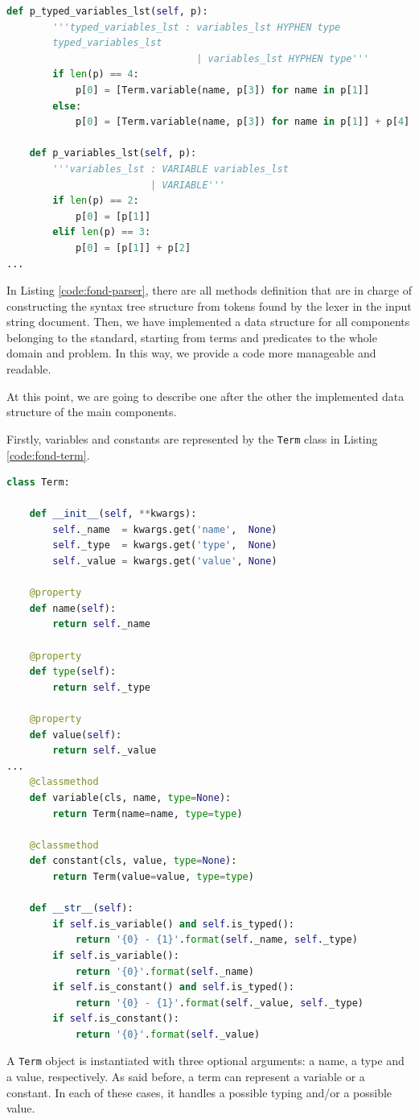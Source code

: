 \begin{lstlisting}[language=Python, style=Python, escapechar = £,  label={code:fond-parser}, caption={The \texttt{MyParser} class.}]
    def p_typed_variables_lst(self, p):
        '''typed_variables_lst : variables_lst HYPHEN type 
        typed_variables_lst
                                 | variables_lst HYPHEN type'''
        if len(p) == 4:
            p[0] = [Term.variable(name, p[3]) for name in p[1]]
        else:
            p[0] = [Term.variable(name, p[3]) for name in p[1]] + p[4]

    def p_variables_lst(self, p):
        '''variables_lst : VARIABLE variables_lst
                         | VARIABLE'''
        if len(p) == 2:
            p[0] = [p[1]]
        elif len(p) == 3:
            p[0] = [p[1]] + p[2]
...
\end{lstlisting}
In Listing \ref{code:fond-parser}, there are all methods definition that are in charge of constructing the syntax tree structure from tokens found by the lexer in the input string document. Then, we have implemented a data structure for all components belonging to the \PDDL standard, starting from terms and predicates to the whole domain and problem. In this way, we provide a code more manageable and readable.

At this point, we are going to describe one after the other the implemented data structure of the main \PDDL components.

Firstly, variables and constants are represented by the \texttt{Term} class in Listing \ref{code:fond-term}.

\begin{lstlisting}[language=Python, style=Python, escapechar = £,  label={code:fond-term}, caption={The \texttt{Term} class.}]
class Term:

    def __init__(self, **kwargs):
        self._name  = kwargs.get('name',  None)
        self._type  = kwargs.get('type',  None)
        self._value = kwargs.get('value', None)

    @property
    def name(self):
        return self._name

    @property
    def type(self):
        return self._type

    @property
    def value(self):
        return self._value
...
    @classmethod
    def variable(cls, name, type=None):
        return Term(name=name, type=type)

    @classmethod
    def constant(cls, value, type=None):
        return Term(value=value, type=type)

    def __str__(self):
        if self.is_variable() and self.is_typed():
            return '{0} - {1}'.format(self._name, self._type)
        if self.is_variable():
            return '{0}'.format(self._name)
        if self.is_constant() and self.is_typed():
            return '{0} - {1}'.format(self._value, self._type)
        if self.is_constant():
            return '{0}'.format(self._value)
\end{lstlisting}
A \texttt{Term} object is instantiated with three optional arguments: a name, a type and a value, respectively. As said before, a term can represent a variable or a constant. In each of these cases, it handles a possible typing and/or a possible value.

